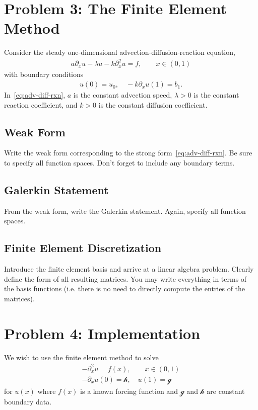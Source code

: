\documentclass[11pt]{article}
\newcommand{\lr}[1]{\left(#1\right)}
\begin{document}
  \section{Problem 3: The Finite Element Method}

  Consider the steady one-dimensional advection-diffusion-reaction equation,
  \begin{align}
    a\partial_{x}u -\lambda u - k\partial_{x}^{2}u = f, \qquad x\in\left(0, 1\right)
    \label{eq:adv-diff-rxn}
  \end{align}
  with boundary conditions 
  \begin{align}
    u\left(0\right) = u_{0}, \quad -k\partial_{x}u\left(1\right) = b_{1}.
    \label{eq:adr_bcs}
  \end{align}
  In~\eqref{eq:adv-diff-rxn}, $a$ is the constant advection speed, $\lambda > 0$ is the constant reaction coefficient, and $k>0$ 
  is the constant diffusion coefficient.  

  \subsection{Weak Form}
  Write the weak form corresponding to the strong form~\eqref{eq:adv-diff-rxn}.  Be sure to specify all function spaces. Don't forget to include any boundary terms.

  

  \subsection{Galerkin Statement}
  From the weak form, write the Galerkin statement.  Again, specify all function spaces.
  
  

  \subsection{Finite Element Discretization}
  Introduce the finite element basis and arrive at a linear algebra problem.  Clearly define the form of all resulting matrices.  You may write everything in terms of the basis functions (i.e. there is no need to directly compute the entries of the matrices).

  
  \pagebreak
  
  \section{Problem 4: Implementation}
  We wish to use the finite element method to solve 
  \begin{align}
    - \partial_{x}^{2} u = f\lr{x}, \qquad x \in \lr{0, 1} \\
    -\partial_{x}u\lr{0} = \mathcal{h}, \quad u\lr{1} = \mathcal{g}
  \end{align}
  for $u\lr{x}$ where $f\lr{x}$ is a known forcing function and $\mathcal{g}$ and $\mathcal{h}$ are constant boundary data.
\end{document}

